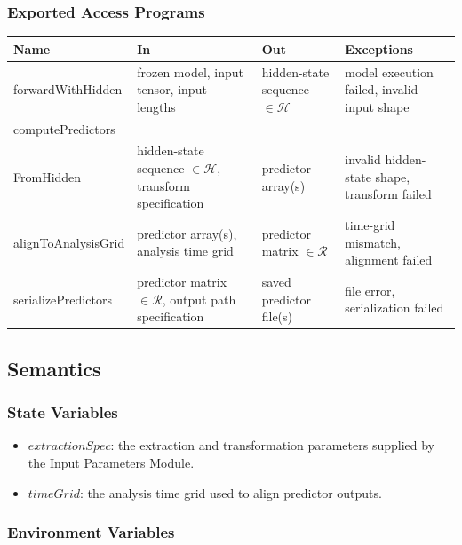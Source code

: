 \documentclass[12pt, titlepage]{article}
\begin{document}
\subsubsection{Exported Access Programs}

\begin{center}
\begin{tabular}{p{3.8cm} p{4.8cm} p{3.8cm} p{3.0cm}}
\hline
\textbf{Name} & \textbf{In} & \textbf{Out} & \textbf{Exceptions} \\
\hline
forwardWithHidden &
frozen model, input tensor, input lengths &
hidden-state sequence $\in \mathcal{H}$ &
model execution failed, invalid input shape \\

computePredictors\\FromHidden &
hidden-state sequence $\in \mathcal{H}$, transform specification &
predictor array(s) &
invalid hidden-state shape, transform failed \\

alignToAnalysisGrid &
predictor array(s), analysis time grid &
predictor matrix $\in \mathcal{R}$ &
time-grid mismatch, alignment failed \\

serializePredictors &
predictor matrix $\in \mathcal{R}$, output path specification &
saved predictor file(s) &
file error, serialization failed \\
\hline
\end{tabular}
\end{center}

\subsection{Semantics}

\subsubsection{State Variables}

\begin{itemize}
    \item $extractionSpec$: the extraction and transformation parameters supplied by the Input Parameters Module.
    \item $timeGrid$: the analysis time grid used to align predictor outputs.
\end{itemize}

\subsubsection{Environment Variables}
\end{document}
